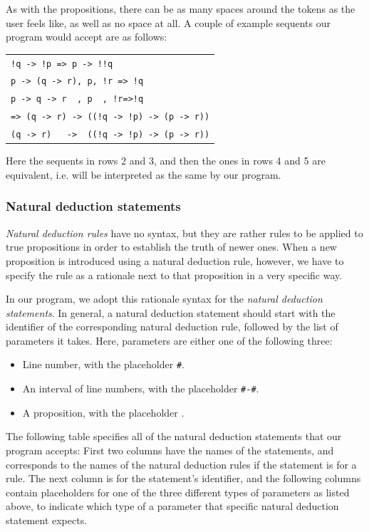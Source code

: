 \documentclass[12pt]{article}
\begin{document}
As with the propositions, there can be as many spaces around the tokens as
the user feels like, as well as no space at all. A couple of example sequents
our program would accept are as follows:

\begin{center}
	\begin{tabular}{l}
		\verb^!q -> !p => p -> !!q^\\
		\verb^p -> (q -> r), p, !r => !q^\\
		\verb^p -> q -> r  , p  , !r=>!q^\\
		\verb^=> (q -> r) -> ((!q -> !p) -> (p -> r))^\\
		\verb^(q -> r)   ->  ((!q -> !p) -> (p -> r))^
	\end{tabular}
\end{center}

Here the sequents in rows 2 and 3, and then the ones in rows 4 and 5
are equivalent, i.e. will be interpreted as the same by our program.

\subsubsection{Natural deduction statements}\label{sec:spec_nd}

\textit{Natural deduction rules} have no syntax, but they are rather rules to be
applied to true propositions in order to establish the truth of newer ones.
When a new proposition is introduced using a natural deduction rule, however,
we have to specify the rule as a rationale next to that proposition in a
very specific way.

\newcommand{\AN}{\texttt{\#}}
\newcommand{\AR}{\texttt{\#-\#}}
\newcommand{\AF}{\texttt{\textphi}}

In our program, we adopt this rationale syntax for the
\textit{natural deduction statements}. In general, a natural deduction statement
should start with the identifier of the corresponding natural deduction rule,
followed by the list of parameters it takes. Here, parameters are either one of
the following three:
\begin{itemize}
	\item Line number, with the placeholder \AN.
	\item An interval of line numbers, with the placeholder \AR.
	\item A proposition, with the placeholder \AF.
\end{itemize}

The following table specifies all of the natural deduction statements that our
program accepts: First two columns have the names of the statements,
and corresponds to the names of the natural deduction rules if the
statement is for a rule. The next column is for the statement's identifier,
and the following columns contain placeholders for one of the three
different types of parameters as listed above, to indicate which type
of a parameter that specific natural deduction statement expects.
\end{document}
